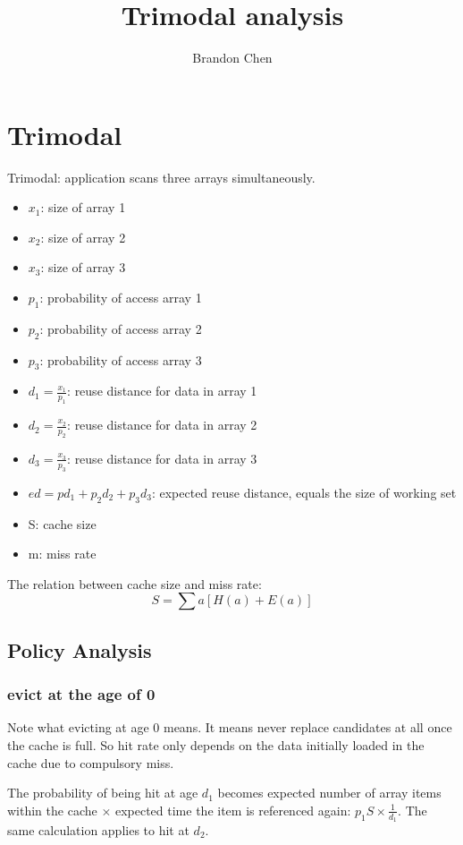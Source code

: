 \documentclass[12pt, letterpaper]{article}
\title{Trimodal analysis}
\author{Brandon Chen}
\begin{document}
\maketitle
\section{Trimodal}

Trimodal: application scans three arrays simultaneously.

\begin{itemize}
\item $x_1$: size of array 1
\item $x_2$: size of array 2
\item $x_3$: size of array 3
\item $p_1$: probability of access array 1
\item $p_2$: probability of access array 2
\item $p_3$: probability of access array 3
\item $d_1 = \frac{x_1}{p_1}$: reuse distance for data in array 1
\item $d_2 = \frac{x_2}{p_2}$: reuse distance for data in array 2
\item $d_3 = \frac{x_3}{p_3}$: reuse distance for data in array 3
\item $ed = p d_1 + p_2 d_2 + p_3 d_3 $: expected reuse distance, equals the
size of working set 
\item S: cache size
\item m: miss rate
\end{itemize}

The relation between cache size and miss rate:
\begin{equation}
S = \sum a [H(a) + E(a)]
\end{equation}

\subsection{Policy Analysis}

\subsubsection{evict at the age of 0}

Note what evicting at age 0 means. It means never replace candidates at all once the cache
is full. So hit rate only depends on the data initially loaded in the cache due
to compulsory miss. 

The probability of being hit at age $d_1$ becomes expected number of array items
within the cache $\times$ expected time the item is referenced again: $p_1 S
\times \frac{1}{d_1}$. The same calculation applies to hit at $d_2$.
\end{document}
